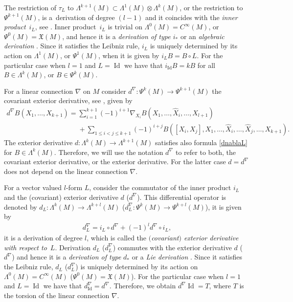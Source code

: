 \documentclass[11pt]{article}
\numberwithin{equation}{section}
\begin{document}
The restriction of $\tau_L$ to $\Lambda^{k+1}(M)\subset
\Lambda^1(M) \otimes \Lambda^k(M)$, or the restriction to
$\Psi^{k+1}(M)$, is a~derivation of degree $(l-1)$ and it
coincides with the \emph{inner product}~$i_L$, see \cite{grifone00,
KMS93}.  Inner product~$i_L$
is trivial on $\Lambda^0(M)=C^{\infty}(M)$, or
$\Psi^0(M)=\mathfrak{X}(M)$, and hence it is a \emph{derivation of type
$i_*$} \cite{grifone00} or an \emph{algebraic derivation}
\cite{KMS93}. Since it satisf\/ies the Leibniz rule, $i_L$ is uniquely
determined by its action on $\Lambda^1(M)$, or $\Psi^1(M)$, when it is
given by $i_LB=B\circ L$. For the particular case when $l=1$ and $L=\operatorname{Id}$ we have that
$i_{\operatorname{Id}}B=kB$ for all $B\in \Lambda^k(M)$, or $B\in
\Psi^k(M)$.

For a linear connection $\nabla$ on $M$ consider
$d^{\nabla}:\Psi^k(M)\to \Psi^{k+1}(M)$ the covariant exterior
derivative, see \cite[\S~11.13]{KMS93}, given by
\begin{gather} \nonumber   d^{\nabla}B(X_1,\dots , X_{k+1}) =
\sum_{i=1}^{k+1}
(-1)^{i+1}\nabla_{X_i}B(X_1,\dots , \hat{X}_i, \dots , X_{l+1})  \\
\label{dnablaL}
\phantom{d^{\nabla}B(X_1,\dots , X_{k+1}) =}{}
+ \sum_{1\leq i<j\leq k+1} (-1)^{i+j}B([X_i,
X_j], X_1,\dots , \hat{X}_i,\dots , \hat{X}_j,\dots , X_{k+1}).\!\!\!
\end{gather} The exterior derivative $d: \Lambda^k(M)\to
\Lambda^{k+1}(M)$ satisf\/ies also formula \eqref{dnablaL} for $B\in
\Lambda^k(M)$. Therefore, we will use the notation $d^{\nabla}$ to refer to
both, the covariant exterior derivative, or the exterior
derivative. For the latter case $d=d^{\nabla}$ does not depend on
the linear connection $\nabla$.

For a vector valued $l$-form $L$, consider the commutator of the inner
product $i_L$ and the (covariant) exterior derivative $d$
($d^{\nabla}$). This dif\/ferential operator is
denoted by  $d_L: \Lambda^k(M) \to \Lambda^{k+l}(M)$ ($d^{\nabla}_L:
\Psi^k(M) \to \Psi^{k+l}(M)$), it is given by
\begin{gather} d^{\nabla}_L=i_L\circ d^{\nabla}+(-1)^{l}d^{\nabla}\circ i_L,
\label{dil}
\end{gather} it is a derivation of degree $l$, which is
called the \emph{$($covariant$)$ exterior derivative with respect to}~$L$. Derivation $d_L$ ($d^{\nabla}_L$) commutes with the exterior
derivative $d$ ($d^{\nabla}$) and hence it is a \emph{derivation of type}
$d_*$ \cite{grifone00} or a \emph{Lie derivation} \cite{KMS93}.
Since it satisf\/ies the Leibniz rule, $d_L$ ($d_{L}^{\nabla}$) is
uniquely determined by its action on $\Lambda^0(M)=C^{\infty}(M)$
($\Psi^0(M)={\mathfrak X}(M)$). For the particular case when $l=1$ and
$L=\operatorname{Id}$ we have that
$d^{\nabla}_{\operatorname{Id}}=d^{\nabla}$. Therefore, we obtain
$d^{\nabla}\operatorname{Id}=T$, where $T$ is the torsion of the linear
connection $\nabla$.
\end{document}
